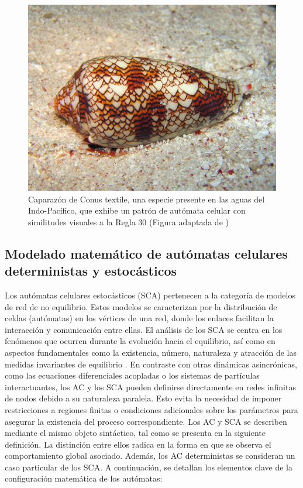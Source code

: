 \begin{figure}[ht]
	\centering\includegraphics[width=\imsize]{Textile_cone}
	\caption[C Caparazón de Conus textile, una especie presente en las aguas del Indo-Pacífico, que exhibe un patrón de autómata celular con similitudes visuales a la Regla 30.]{ Caparazón de Conus textile, una especie presente en las aguas del Indo-Pacífico, que exhibe un patrón de autómata celular con similitudes visuales a la Regla 30 (Figura adaptada de \protect\cite{ling_english_2005})} \label{fig:conus}
\end{figure}


\subsection{Modelado matemático de autómatas celulares deterministas y estocásticos}\label{sec:SCA}

Los autómatas celulares estocásticos (SCA) pertenecen a la categoría de modelos de red de no equilibrio. Estos modelos se caracterizan por la distribución de celdas (autómatas) en los vértices de una red, donde los enlaces facilitan la interacción y comunicación entre ellas. El análisis de los SCA se centra en los fenómenos que ocurren durante la evolución hacia el equilibrio, así como en aspectos fundamentales como la existencia, número, naturaleza y atracción de las medidas invariantes  de equilibrio \cite{louis_probabilistic_2018}.   En contraste con otras dinámicas asincrónicas, como las ecuaciones diferenciales acopladas o los sistemas de partículas interactuantes, los AC y los SCA pueden definirse directamente en redes infinitas de nodos debido a su naturaleza paralela. Esto evita la necesidad de imponer restricciones a regiones finitas o condiciones adicionales sobre los parámetros para asegurar la existencia del proceso correspondiente. Los AC y SCA se describen mediante el mismo objeto sintáctico, tal como se presenta en la siguiente definición. La distinción entre ellos radica en la forma en que se observa el comportamiento global asociado. Además, los AC deterministas se consideran un caso particular de los SCA. A continuación, se detallan los elementos clave de la configuración matemática de los autómatas:


